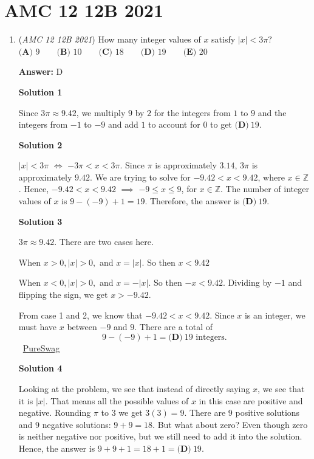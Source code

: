 \section{AMC 12 12B 2021}
        \begin{enumerate}
        	\item (\textit{AMC 12 12B 2021}) How many integer values of $x$ satisfy $|x|<3\pi?$
$\textbf{(A) }9 \qquad \textbf{(B) }10 \qquad \textbf{(C) }18 \qquad \textbf{(D) }19 \qquad \textbf{(E) }20$

 \textbf{Answer: }D



\textbf{Solution 1}

Since $3\pi\approx9.42$, we multiply $9$ by $2$ for the integers from $1$ to $9$ and the integers from $-1$ to $-9$ and add $1$ to account for $0$ to get $\boxed{\textbf{(D)} ~19}$.

 



\textbf{Solution 2}

$|x|<3\pi$ $\iff$ $-3\pi<x<3\pi$. Since $\pi$ is approximately $3.14$, $3\pi$ is approximately $9.42$. We are trying to solve for $-9.42<x<9.42$, where $x\in\mathbb{Z}$. Hence, $-9.42<x<9.42$ $\implies$ $-9\leq x\leq9$, for $x\in\mathbb{Z}$. The number of integer values of $x$ is $9-(-9)+1=19$. Therefore, the answer is $\boxed{\textbf{(D)} ~19}$.

 



\textbf{Solution 3}

$3\pi \approx 9.42.$ There are two cases here.

 When $x>0, |x|>0,$ and $x = |x|.$ So then $x<9.42$

 When $x<0, |x|>0,$ and $x = -|x|.$ So then $-x<9.42$. Dividing by $-1$ and flipping the sign, we get $x>-9.42.$

 From case 1 and 2, we know that $-9.42 < x < 9.42$. Since $x$ is an integer, we must have $x$ between $-9$ and $9$. There are a total of 
 \[9-(-9) + 1 = \boxed{\textbf{(D)} ~19} \text{ integers}.\]~\href{https://artofproblemsolving.com/wiki/index.php?title=User:PureSwag}{PureSwag}

 



\textbf{Solution 4}

Looking at the problem, we see that instead of directly saying $x$, we see that it is $|x|.$ That means all the possible values of $x$ in this case are positive and negative. Rounding $\pi$ to $3$ we get $3(3)=9.$ There are $9$ positive solutions and $9$ negative solutions: $9+9=18.$ But what about zero? Even though zero is neither negative nor positive, but we still need to add it into the solution. Hence, the answer is $9+9+1=18+1=\boxed{\textbf{(D)} ~19}.$





\end{enumerate}
